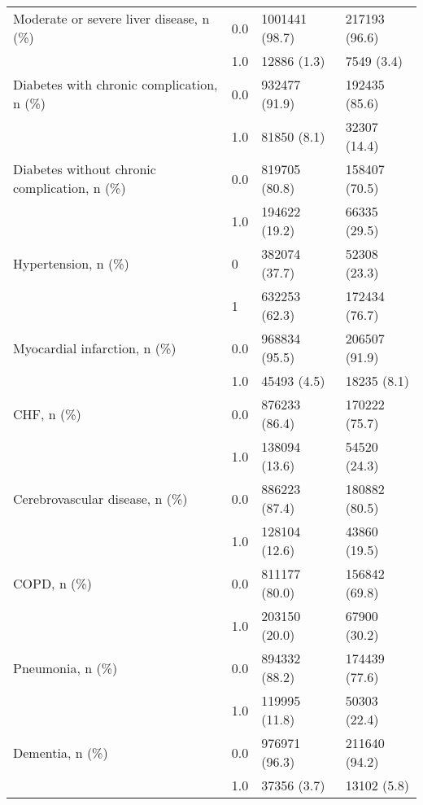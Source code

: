 \begin{tabular}{llll}
Moderate or severe liver disease, n (\%) & 0.0 &                 1001441 (98.7) &     217193 (96.6) \\
                                       & 1.0 &                    12886 (1.3) &        7549 (3.4) \\
Diabetes with chronic complication, n (\%) & 0.0 &                  932477 (91.9) &     192435 (85.6) \\
                                       & 1.0 &                    81850 (8.1) &      32307 (14.4) \\
Diabetes without chronic complication, n (\%) & 0.0 &                  819705 (80.8) &     158407 (70.5) \\
                                       & 1.0 &                  194622 (19.2) &      66335 (29.5) \\
Hypertension, n (\%) & 0 &                  382074 (37.7) &      52308 (23.3) \\
                                       & 1 &                  632253 (62.3) &     172434 (76.7) \\
Myocardial infarction, n (\%) & 0.0 &                  968834 (95.5) &     206507 (91.9) \\
                                       & 1.0 &                    45493 (4.5) &       18235 (8.1) \\
CHF, n (\%) & 0.0 &                  876233 (86.4) &     170222 (75.7) \\
                                       & 1.0 &                  138094 (13.6) &      54520 (24.3) \\
Cerebrovascular disease, n (\%) & 0.0 &                  886223 (87.4) &     180882 (80.5) \\
                                       & 1.0 &                  128104 (12.6) &      43860 (19.5) \\
COPD, n (\%) & 0.0 &                  811177 (80.0) &     156842 (69.8) \\
                                       & 1.0 &                  203150 (20.0) &      67900 (30.2) \\
Pneumonia, n (\%) & 0.0 &                  894332 (88.2) &     174439 (77.6) \\
                                       & 1.0 &                  119995 (11.8) &      50303 (22.4) \\
Dementia, n (\%) & 0.0 &                  976971 (96.3) &     211640 (94.2) \\
                                       & 1.0 &                    37356 (3.7) &       13102 (5.8) \\

\end{tabular}
